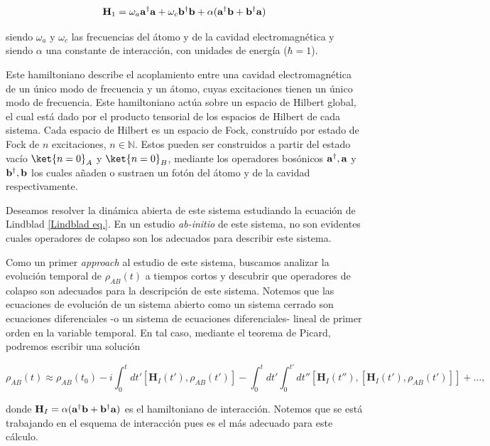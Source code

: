 \begin{equation}
    \mathbf{H}_1 = \omega_a {\bf a}^{\dagger}{\bf a} + \omega_c {\bf b}^{\dagger}{\bf b} + \alpha({\bf a}^{\dagger}{\bf b}+ {\bf b}^{\dagger}{\bf a})
    \label{model1_hamiltonian}
\end{equation}

siendo $\omega_a$ y $\omega_c$ las frecuencias del átomo y de la cavidad electromagnética y siendo $\alpha$ una constante de interacción, con unidades de energía ($\hbar = 1$). 

Este hamiltoniano describe el acoplamiento entre una cavidad electromagnética de un único modo de frecuencia y un átomo, cuyas excitaciones tienen un único modo de frecuencia. Este hamiltoniano actúa sobre un espacio de Hilbert global, el cual está dado por el producto tensorial de los espacios de Hilbert de cada sistema. Cada espacio de Hilbert es un espacio de Fock, construído por estado de Fock de $n$ excitaciones, $n \in \mathds{N}$. Estos pueden ser construidos a partir del estado vacío $\ket{n=0}_{A}$ y $\ket{n=0}_{B}$, mediante los operadores bosónicos ${\bf a}^{\dagger}, {\bf a}$ y ${\bf b}^{\dagger}, {\bf b}$ los cuales añaden o sustraen un fotón del átomo y de la cavidad respectivamente. 

 Deseamos resolver la dinámica abierta de este sistema estudiando la ecuación de Lindblad \eqref{Lindblad eq.}. En un estudio \textit{ab-initio} de este sistema, no son evidentes cuales operadores de colapso son los adecuados para describir este sistema.  

Como un primer \textit{approach} al estudio de este sistema, buscamos analizar la evolución temporal de $\rho_{AB}(t)$ a tiempos cortos y descubrir que operadores de colapso son adecuados para la descripción de este sistema. Notemos que las ecuaciones de evolución de un sistema abierto como un sistema cerrado son ecuaciones diferenciales -o un sistema de ecuaciones diferenciales- lineal de primer orden en la variable temporal. En tal caso, mediante el teorema de Picard, podremos escribir una solución 

\begin{equation}
    \rho_{AB}(t) \approx \rho_{AB}(t_0)-i\int_{0}^{t} dt' [\mathbf{H}_{I}(t'), \rho_{AB}(t')] - \int_{0}^{t} dt' \int_{0}^{t'} dt'' [\mathbf{H}_{I}(t''),[\mathbf{H}_{I}(t'), \rho_{AB}(t')]] + \ldots,
\end{equation}

donde $\mathbf{H}_I = \alpha({\bf a}^{\dagger}{\bf b}+ {\bf b}^{\dagger}{\bf a})$ es el hamiltoniano de interacción. Notemos que se está trabajando en el esquema de interacción pues es el más adecuado para este cálculo. 

